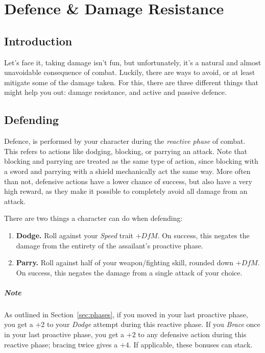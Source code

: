 \chapter{Defence \& Damage Resistance}\label{chap:defence}
\section{Introduction}
Let's face it, taking damage isn't fun, but unfortunately, it's a natural and almost unavoidable consequence of combat.
Luckily, there are ways to avoid, or at least mitigate some of the damage taken.
For this, there are three different things that might help you out: damage resistance, and active and passive defence.

\section{Defending}
Defence, is performed by your character during the \textit{reactive phase} of combat.
This refers to actions like dodging, blocking, or parrying an attack.
Note that blocking and parrying are treated as the same type of action, since blocking with a sword and parrying with a shield mechanically act the same way.
More often than not, defensive actions have a lower chance of success, but also have a very high reward, as they make it possible to completely avoid all damage from an attack.

There are two things a character can do when defending:
\begin{enumerate}
    \item \textbf{Dodge.} Roll against your \textit{Speed} trait $+ \mathit{DfM}$.
        On success, this negates the damage from the entirety of the assailant's proactive phase.
    \item \textbf{Parry.} Roll against half of your weapon/fighting skill, rounded down $+ \mathit{DfM}$.
        On success, this negates the damage from a single attack of your choice.
\end{enumerate}

\paragraph{Note} As outlined in Section~\ref{sec:phases}, if you moved in your last proactive phase, you get a +2 to your \textit{Dodge} attempt during this reactive phase. 
If you \textit{Brace} once in your last proactive phase, you get a $+2$ to any defensive action during this reactive phase; bracing twice gives a $+4$. 
If applicable, these bonuses can stack.

